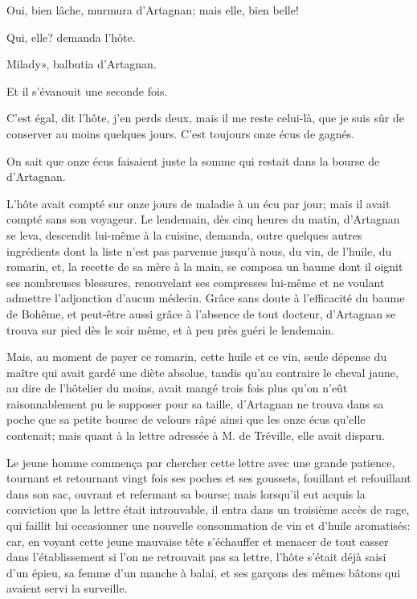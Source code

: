 \speak  Oui, bien lâche, murmura d'Artagnan; mais elle, bien belle! 

\speak  Qui, elle? demanda l'hôte. 

\speak  Milady», balbutia d'Artagnan. 

Et il s'évanouit une seconde fois. 

\speak  C'est égal, dit l'hôte, j'en perds deux, mais il me reste celui-là, que je suis sûr de conserver au moins quelques jours. C'est toujours onze écus de gagnés. 

On sait que onze écus faisaient juste la somme qui restait dans la bourse de d'Artagnan. 

L'hôte avait compté sur onze jours de maladie à un écu par jour; mais il avait compté sans son voyageur. Le lendemain, dès cinq heures du matin, d'Artagnan se leva, descendit lui-même à la cuisine, demanda, outre quelques autres ingrédients dont la liste n'est pas parvenue jusqu'à nous, du vin, de l'huile, du romarin, et, la recette de sa mère à la main, se composa un baume dont il oignit ses nombreuses blessures, renouvelant ses compresses lui-même et ne voulant admettre l'adjonction d'aucun médecin. Grâce sans doute à l'efficacité du baume de Bohême, et peut-être aussi grâce à l'absence de tout docteur, d'Artagnan se trouva sur pied dès le soir même, et à peu près guéri le lendemain. 

Mais, au moment de payer ce romarin, cette huile et ce vin, seule dépense du maître qui avait gardé une diète absolue, tandis qu'au contraire le cheval jaune, au dire de l'hôtelier du moins, avait mangé trois fois plus qu'on n'eût raisonnablement pu le supposer pour sa taille, d'Artagnan ne trouva dans sa poche que sa petite bourse de velours râpé ainsi que les onze écus qu'elle contenait; mais quant à la lettre adressée à M. de Tréville, elle avait disparu. 

Le jeune homme commença par chercher cette lettre avec une grande patience, tournant et retournant vingt fois ses poches et ses goussets, fouillant et refouillant dans son sac, ouvrant et refermant sa bourse; mais lorsqu'il eut acquis la conviction que la lettre était introuvable, il entra dans un troisième accès de rage, qui faillit lui occasionner une nouvelle consommation de vin et d'huile aromatisés: car, en voyant cette jeune mauvaise tête s'échauffer et menacer de tout casser dans l'établissement si l'on ne retrouvait pas sa lettre, l'hôte s'était déjà saisi d'un épieu, sa femme d'un manche à balai, et ses garçons des mêmes bâtons qui avaient servi la surveille. 


